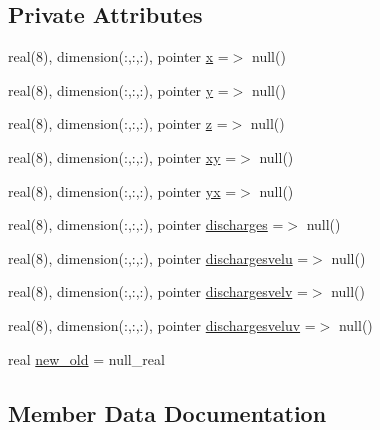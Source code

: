 \subsection*{Private Attributes}
\begin{DoxyCompactItemize}
\item 
real(8), dimension(\+:,\+:,\+:), pointer \mbox{\hyperlink{structmodulehydrodynamic_1_1t__waterfluxes_adf27368dc1ce97f2a83f7c38d3a46c0a}{x}} =$>$ null()
\item 
real(8), dimension(\+:,\+:,\+:), pointer \mbox{\hyperlink{structmodulehydrodynamic_1_1t__waterfluxes_a7a3cca53d8e06454150a012b099acc03}{y}} =$>$ null()
\item 
real(8), dimension(\+:,\+:,\+:), pointer \mbox{\hyperlink{structmodulehydrodynamic_1_1t__waterfluxes_a8b734ab2a1121ea34200947d7b772889}{z}} =$>$ null()
\item 
real(8), dimension(\+:,\+:,\+:), pointer \mbox{\hyperlink{structmodulehydrodynamic_1_1t__waterfluxes_ae0011d007370e22f272f8c04762e21a0}{xy}} =$>$ null()
\item 
real(8), dimension(\+:,\+:,\+:), pointer \mbox{\hyperlink{structmodulehydrodynamic_1_1t__waterfluxes_a02a0a063ac1de6cb569d6d40a285f51c}{yx}} =$>$ null()
\item 
real(8), dimension(\+:,\+:,\+:), pointer \mbox{\hyperlink{structmodulehydrodynamic_1_1t__waterfluxes_ab2f4f49988ac35b3c51b40b8bebe8d88}{discharges}} =$>$ null()
\item 
real(8), dimension(\+:,\+:,\+:), pointer \mbox{\hyperlink{structmodulehydrodynamic_1_1t__waterfluxes_aed09b9c7152e9c25cee1e4a736f51d5a}{dischargesvelu}} =$>$ null()
\item 
real(8), dimension(\+:,\+:,\+:), pointer \mbox{\hyperlink{structmodulehydrodynamic_1_1t__waterfluxes_a31241b74be075028511548fa650c5886}{dischargesvelv}} =$>$ null()
\item 
real(8), dimension(\+:,\+:,\+:), pointer \mbox{\hyperlink{structmodulehydrodynamic_1_1t__waterfluxes_aec9388b3bf2ac8c2fd1f4431b315e25d}{dischargesveluv}} =$>$ null()
\item 
real \mbox{\hyperlink{structmodulehydrodynamic_1_1t__waterfluxes_a256329603160692c59cd042f2e2d75f3}{new\+\_\+old}} = null\+\_\+real
\end{DoxyCompactItemize}


\subsection{Member Data Documentation}
\mbox{\label{structmodulehydrodynamic_1_1t__waterfluxes_ab2f4f49988ac35b3c51b40b8bebe8d88}} 
